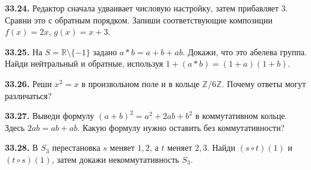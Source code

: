 \noindent\begin{minipage}[t]{\linewidth}\textbf{33.24.} Редактор сначала удваивает числовую настройку, затем прибавляет \(3\). Сравни это с обратным порядком. Запиши соответствующие композиции \(f(x)=2x\), \(g(x)=x+3\).\par\end{minipage}\par
\noindent\begin{minipage}[t]{\linewidth}\textbf{33.25.}\starmark{} На \(S=\mathbb R\setminus\{-1\}\) задано \(a*b=a+b+ab\). Докажи, что это абелева группа. Найди нейтральный и обратные, используя \(1+(a*b)=(1+a)(1+b)\).\par\end{minipage}\par
\noindent\begin{minipage}[t]{\linewidth}\textbf{33.26.}\starmark{} Реши \(x^2=x\) в произвольном поле и в кольце \(\mathbb Z/6\mathbb Z\). Почему ответы могут различаться?\par\end{minipage}\par
\noindent\begin{minipage}[t]{\linewidth}\textbf{33.27.}\starmark{} Выведи формулу \((a+b)^2=a^2+2ab+b^2\) в коммутативном кольце. Здесь \(2ab=ab+ab\). Какую формулу нужно оставить без коммутативности?\par\end{minipage}\par
\noindent\begin{minipage}[t]{\linewidth}\textbf{33.28.}\starmark{} В \(S_3\) перестановка \(s\) меняет \(1,2\), а \(t\) меняет \(2,3\). Найди \((s\circ t)(1)\) и \((t\circ s)(1)\), затем докажи некоммутативность \(S_3\).\par\end{minipage}\par
\endgroup
